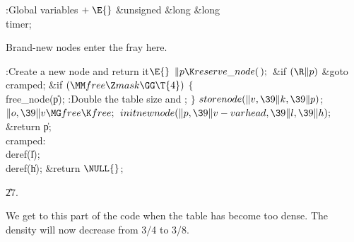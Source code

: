 \B{}:Global variables\X${}\mathrel+\E{}$\6
\&{unsigned} \&{long} \&{long} \\{timer};\par
\fi

Brand-new nodes enter the fray here.

\Y\B\4:Create a new node and return it\X${}\E{}$\6
$\|p\K\\{reserve\_node}(\,);{}$\6
\&{if} ${}(\R\|p){}$\1\5
\&{goto} \\{cramped};\2\6
\&{if} ${}(\MM\\{free}\Z\\{mask}\GG\T{4}){}$\5
${}\{{}$\1\6
\\{free\_node}(\|p);\6
:Double the table size and \X;\6
\4${}\}{}$\2\6
${}\\{storenode}(\|v,\39\|k,\39\|p){}$;\5
${}\|o,\39\|v\MG\\{free}\K\\{free};{}$\6
${}\\{initnewnode}(\|p,\39\|v-\\{varhead},\39\|l,\39\|h);{}$\6
\&{return} \|p;\6
\4\\{cramped}:\6
\\{deref}(\|l);\6
\\{deref}(\|h);\6
\&{return} ${}\NULL{}$;\par
\U27.\fi

We get to this part of the code when the table has become
too dense.
The density will now decrease from 3/4 to 3/8.

